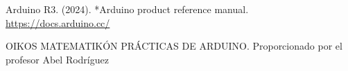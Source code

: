 Arduino R3. (2024). *Arduino product reference manual. \url{https://docs.arduino.cc/}

OIKOS MATEMATIKÓN PRÁCTICAS DE ARDUINO. Proporcionado por el profesor Abel Rodríguez